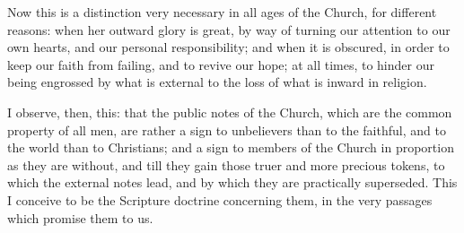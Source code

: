 Now this is a distinction very necessary in all ages of the Church,
for different reasons: when her outward glory is great, by way of
turning our attention to our own hearts, and our personal
responsibility; and when it is obscured, in order to keep our faith
from failing, and to revive our hope; at all times, to hinder our
being engrossed by what is external to the loss of what is inward in
religion.

I observe, then, this: that the public notes of the Church, which
are the common property of all men, are rather a sign to unbelievers
than to the faithful, and to the world than to Christians; and a sign
to members of the Church in proportion as they are without, and till
they gain those truer and more precious tokens, to which the external
notes lead, and by which they are practically superseded. This I
conceive to be the Scripture doctrine concerning them, in the very
passages which promise them to us.

